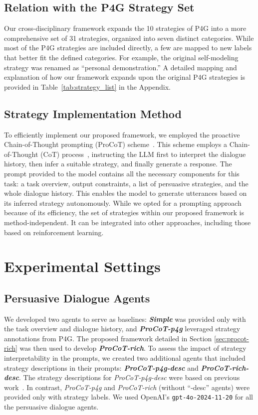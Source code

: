 \documentclass[11pt]{article}
\begin{document}
\subsection{Relation with the P4G Strategy Set}
Our cross-disciplinary framework expands the 10 strategies of P4G into a more comprehensive set of 31 strategies, organized into seven distinct categories. 
While most of the P4G strategies are included directly, a few are mapped to new labels that better fit the defined categories. 
For example, the original self-modeling strategy was renamed as ``personal demonstration.''
A detailed mapping and explanation of how our framework expands upon the original P4G strategies is provided in Table~\ref{tab:strategy_list} in the Appendix.


\subsection{Strategy Implementation Method}
To efficiently implement our proposed framework, we employed the proactive Chain-of-Thought prompting (ProCoT) scheme~\citep{deng-etal-2023-prompting}. 
This scheme employs a Chain-of-Thought (CoT) process~\citep{10.5555/3600270.3602070}, instructing the LLM first to interpret the dialogue history, then infer a suitable strategy, and finally generate a response. 
The prompt provided to the model contains all the necessary components for this task: a task overview, output constraints, a list of persuasive strategies, and the whole dialogue history. 
This enables the model to generate utterances based on its inferred strategy autonomously.
While we opted for a prompting approach because of its efficiency, the set of strategies within our proposed framework is method-independent. It can be integrated into other approaches, including those based on reinforcement learning.





\section{Experimental Settings}
\subsection{Persuasive Dialogue Agents}
We developed two agents to serve as baselines: \textbf{\textit{Simple}} was provided only with the task overview and dialogue history, and \textbf{\textit{ProCoT-p4g}} leveraged strategy annotations from P4G.  
The proposed framework detailed in Section \ref{sec:procot-rich} was then used to develop \textbf{\textit{ProCoT-rich}}. 
To assess the impact of strategy interpretability in the prompts, we created two additional agents that included strategy descriptions in their prompts: \textbf{\textit{ProCoT-p4g-desc}} and \textbf{\textit{ProCoT-rich-desc}}. 
The strategy descriptions for \textit{ProCoT-p4g-desc} were based on previous work~\citep{wang-etal-2019-persuasion}. 
In contrast, \textit{ProCoT-p4g} and \textit{ProCoT-rich} (without ``-desc'' agents) were provided only with strategy labels. 
We used OpenAI's \texttt{gpt-4o-2024-11-20} for all the persuasive dialogue agents.
\end{document}
